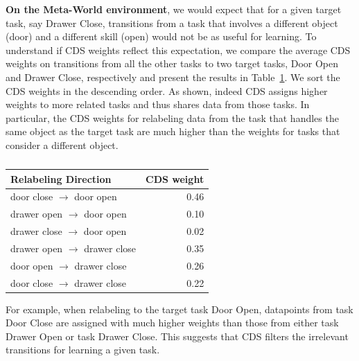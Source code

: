{\textbf{On the Meta-World environment}, we would expect that for a given target task, say Drawer Close, transitions from a task that involves a different object (door) and a different skill (open) would not be as useful for learning. To understand if CDS weights reflect this expectation, we compare the average CDS weights on transitions from all the other tasks to two target tasks, Door Open and Drawer Close, respectively and present the results in Table~\ref{tbl:cds_weights}. We sort the CDS weights in the descending order. As shown, indeed CDS assigns higher weights to more related tasks and thus shares data from those tasks. In particular, the CDS weights for relabeling data from the task that handles the same object as the target task are much higher than the weights for tasks that consider a different object. 

\begin{table}[h]
\centering
\footnotesize
\begin{tabular}{l|r}
\toprule
{\textbf{Relabeling Direction}}                 & \textbf{CDS weight} \\
\midrule
{{door close $\rightarrow$ door open}}   & 0.46       \\
{{drawer open $\rightarrow$ door open}}  & 0.10       \\
{{drawer close $\rightarrow$ door open}} & 0.02       \\ \midrule
{drawer open $\rightarrow$ drawer close}                     & 0.35       \\
{door open $\rightarrow$ drawer close}                       & 0.26       \\
{door close $\rightarrow$ drawer close}                      & 0.22      \\ 
\bottomrule
\end{tabular}
\vspace{0.2cm}
\caption{\footnotesize {}
}
\vspace{-0.3cm}
\label{tbl:cds_weights}
\end{table}

For example, when relabeling to the target task Door Open, datapoints from task Door Close are assigned with much higher weights than those from either task Drawer Open or task Drawer Close. This suggests that CDS filters the irrelevant transitions for learning a given task.


}

